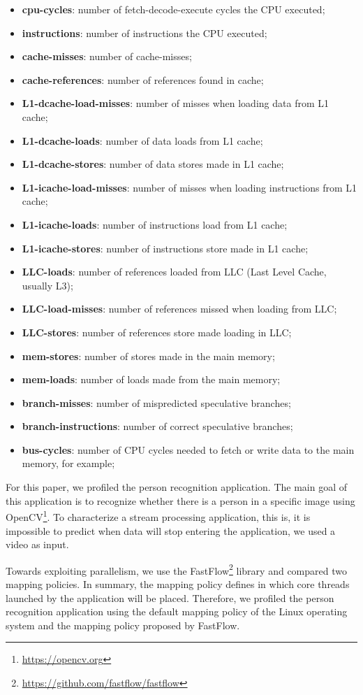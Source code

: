 \begin{itemize}
	\item \textbf{cpu-cycles}: number of fetch-decode-execute cycles the CPU executed;
	\item \textbf{instructions}: number of instructions the CPU executed;
	\item \textbf{cache-misses}: number of cache-misses;
	\item \textbf{cache-references}: number of references found in cache;
	\item \textbf{L1-dcache-load-misses}: number of misses when loading data from L1 cache;
	\item \textbf{L1-dcache-loads}: number of data loads from L1 cache;
	\item \textbf{L1-dcache-stores}: number of data stores made in L1 cache;
	\item \textbf{L1-icache-load-misses}: number of misses when loading instructions from L1 cache;
	\item \textbf{L1-icache-loads}: number of instructions load from L1 cache;
	\item \textbf{L1-icache-stores}: number of instructions store made in L1 cache;
	\item \textbf{LLC-loads}: number of references loaded from LLC (Last Level Cache, usually L3);
	\item \textbf{LLC-load-misses}: number of references missed when loading from LLC;
	\item \textbf{LLC-stores}: number of references store made loading in LLC;
	\item \textbf{mem-stores}: number of stores made in the main memory;
	\item \textbf{mem-loads}: number of loads made from the main memory;
	\item \textbf{branch-misses}: number of mispredicted speculative branches;
    \item \textbf{branch-instructions}: number of correct speculative branches;
	\item \textbf{bus-cycles}: number of CPU cycles needed to fetch or write data to the main memory, for example;
\end{itemize}

For this paper, we profiled the person recognition application. The main goal of this application is to recognize whether there is a person in a specific image using OpenCV\footnote{\url{https://opencv.org}}. To characterize a stream processing application, this is, it is impossible to predict when data will stop entering the application, we used a video as input.

Towards exploiting parallelism, we use the FastFlow\footnote{\url{https://github.com/fastflow/fastflow}} library and compared two mapping policies. In summary, the mapping policy defines in which core threads launched by the application will be placed. Therefore, we profiled the person recognition application using the default mapping policy of the Linux operating system and the mapping policy proposed by FastFlow.
